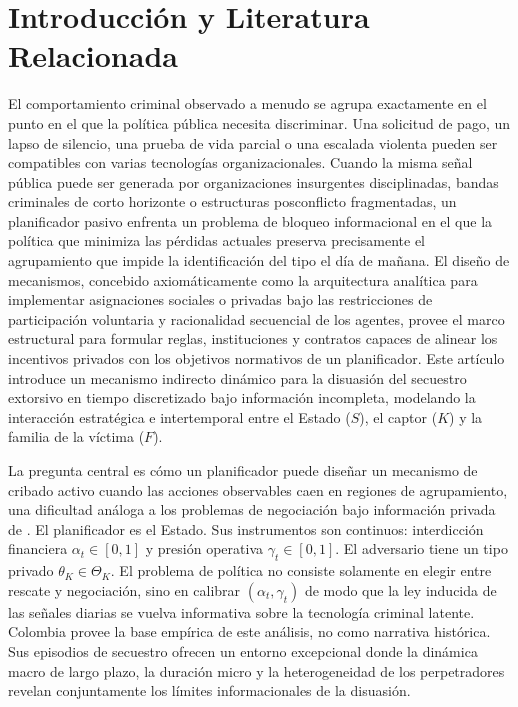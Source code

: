 \documentclass[review,authoryear,12pt]{elsarticle}
\theoremstyle{plain}
\theoremstyle{definition}
\newcommand{\ThetaK}{\Theta_K}
\newcommand{\1}{\mathbf{1}}
\begin{document}
\section{Introducción y Literatura Relacionada}\label{sec:intro}

El comportamiento criminal observado a menudo se agrupa exactamente en el punto en el que la política pública necesita discriminar. Una solicitud de pago, un lapso de silencio, una prueba de vida parcial o una escalada violenta pueden ser compatibles con varias tecnologías organizacionales. Cuando la misma señal pública puede ser generada por organizaciones insurgentes disciplinadas, bandas criminales de corto horizonte o estructuras posconflicto fragmentadas, un planificador pasivo enfrenta un problema de bloqueo informacional en el que la política que minimiza las pérdidas actuales preserva precisamente el agrupamiento que impide la identificación del tipo el día de mañana. El diseño de mecanismos, concebido axiomáticamente como la arquitectura analítica para implementar asignaciones sociales o privadas bajo las restricciones de participación voluntaria y racionalidad secuencial de los agentes, provee el marco estructural para formular reglas, instituciones y contratos capaces de alinear los incentivos privados con los objetivos normativos de un planificador. Este artículo introduce un mecanismo indirecto dinámico para la disuasión del secuestro extorsivo en tiempo discretizado bajo información incompleta, modelando la interacción estratégica e intertemporal entre el Estado ($S$), el captor ($K$) y la familia de la víctima ($F$).

La pregunta central es cómo un planificador puede diseñar un mecanismo de cribado activo cuando las acciones observables caen en regiones de agrupamiento, una dificultad análoga a los problemas de negociación bajo información privada de \citet{Fearon1995Rationalist}. El planificador es el Estado. Sus instrumentos son continuos: interdicción financiera $\alpha_t\in[0,1]$ y presión operativa $\gamma_t\in[0,1]$. El adversario tiene un tipo privado $\theta_K\in\ThetaK$. El problema de política no consiste solamente en elegir entre rescate y negociación, sino en calibrar $(\alpha_t,\gamma_t)$ de modo que la ley inducida de las señales diarias se vuelva informativa sobre la tecnología criminal latente. Colombia provee la base empírica de este análisis, no como narrativa histórica. Sus episodios de secuestro ofrecen un entorno excepcional donde la dinámica macro de largo plazo, la duración micro y la heterogeneidad de los perpetradores revelan conjuntamente los límites informacionales de la disuasión.
\end{document}
